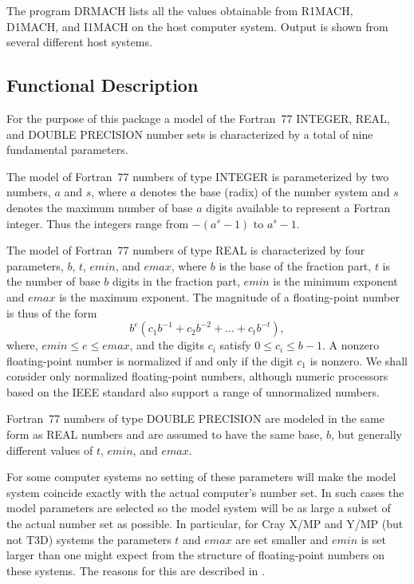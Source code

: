 \documentclass[twoside]{MATH77}
\begin{document}
The program DRMACH lists all the values obtainable from R1MACH, D1MACH, and
I1MACH on the host computer system. Output is shown from several different
host systems.

\subsection{Functional Description}

For the purpose of this package a model of the Fortran~77 INTEGER, REAL, and
DOUBLE PRECISION number sets is characterized by a total of nine fundamental
parameters.

The model of Fortran~77 numbers of type INTEGER is parameterized by two
numbers, $a$ and $s$, where $a$ denotes the base (radix) of the number
system and $s$ denotes the maximum number of base $a$ digits available to
represent a Fortran integer. Thus the integers range from $-(a^s -1)$ to $%
a^s -1.$

The model of Fortran~77 numbers of type REAL is characterized by four
parameters, $b$, $t$, $emin$, and $emax$, where $b$ is the base of the
fraction part, $t$ is the number of base $b$ digits in the fraction part, $%
emin $ is the minimum exponent and $emax$ is the maximum exponent. The
magnitude of a floating-point number is thus of the form%
\begin{equation*}
b^e\left( c_1b^{-1}+c_2b^{-2}+...+c_tb^{-t}\right) ,
\end{equation*}
where, $emin\leq e\leq emax$, and the digits $c_i$ satisfy $0\leq c_i\leq
b-1.$ A nonzero floating-point number is normalized if and only if the digit
$c_1$ is nonzero. We shall consider only normalized floating-point numbers,
although numeric processors based on the IEEE standard also support a
range of unnormalized numbers.

Fortran~77 numbers of type DOUBLE PRECISION are modeled in the same form as
REAL numbers and are assumed to have the same base, $b$, but generally
different values of $t$, $emin$, and $emax$.

For some computer systems no setting of these parameters will make the model
system coincide exactly with the actual computer's number set. In such cases
the model parameters are selected so the model system will be as large a
subset of the actual number set as possible. In particular, for Cray
X/MP and Y/MP (but not T3D) systems the parameters $t$ and $emax$ are set
smaller and $emin$ is set larger than one might expect from the structure
of floating-point numbers on these systems. The reasons for this are
described in \cite{Schryer:1981:ATO}.
\end{document}
